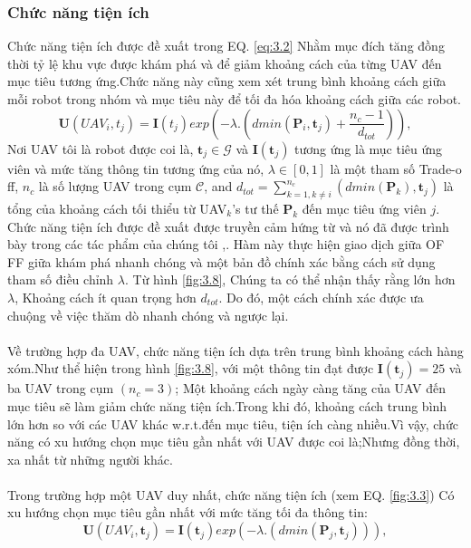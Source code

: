 \documentclass[11pt,openany]{book}
\begin{document}
\begin{algorimth}[H]
\subsubsection{Chức năng tiện ích}
Chức năng tiện ích được đề xuất trong EQ. \ref{eq:3.2} Nhằm mục đích tăng đồng thời tỷ lệ khu vực được khám phá và để giảm khoảng cách của từng UAV đến mục tiêu tương ứng.Chức năng này cũng xem xét trung bình khoảng cách giữa mỗi robot trong nhóm và mục tiêu này để tối đa hóa khoảng cách giữa các robot.
\begin{equation}
    \mathbf{U}(UAV_i,t_j)=\mathbf{I}(t_j)exp(-\lambda.(dmin(\mathbf{P}_i,\mathbf{t}_j)+\frac{n_c-1}{d_{tot}})),
\end{equation}
Nơi UAV tôi là robot được coi là, $\mathbf{t}_j \in \mathcal{G}$ và $\mathbf{I}(\mathbf{t}_j)$ tương ứng là mục tiêu ứng viên và mức tăng thông tin tương ứng của nó, $\lambda \in [0,1]$ là một tham số Trade-o ff, $n_c$ là số lượng UAV trong cụm $\mathcal{C}$, and $d_{tot} = \sum_{k=1, k\neq i}^{n_c}(dmin(\mathbf{P}_k),\mathbf{t}_j) $ là tổng của khoảng cách tối thiểu từ UAV$_k$'s tư thế $\mathbf{P}_k$ đến mục tiêu ứng viên $j$. Chức năng tiện ích được đề xuất được truyền cảm hứng từ \cite{heng2015efficient} và nó đã được trình bày trong các tác phẩm của chúng tôi \cite{mahdoui2017cooperative},\cite{mahdoui2018cooperative}. Hàm này thực hiện giao dịch giữa OF FF giữa khám phá nhanh chóng và một bản đồ chính xác bằng cách sử dụng tham số điều chỉnh $\lambda$. Từ hình \ref{fig:3.8}, Chúng ta có thể nhận thấy rằng lớn hơn $\lambda$, Khoảng cách ít quan trọng hơn $d_{tot}$. Do đó, một cách chính xác được ưa chuộng về việc thăm dò nhanh chóng và ngược lại.\\\\
Về trường hợp đa UAV, chức năng tiện ích dựa trên trung bình khoảng cách hàng xóm.Như thể hiện trong hình \ref{fig:3.8}, với một thông tin đạt được $\mathbf{I}(\mathbf{t}_j)=25$ và ba UAV trong cụm $(n_c=3)$; Một khoảng cách ngày càng tăng của UAV đến mục tiêu sẽ làm giảm chức năng tiện ích.Trong khi đó, khoảng cách trung bình lớn hơn so với các UAV khác w.r.t.đến mục tiêu, tiện ích càng nhiều.Vì vậy, chức năng có xu hướng chọn mục tiêu gần nhất với UAV được coi là;Nhưng đồng thời, xa nhất từ những người khác.\\\\
Trong trường hợp một UAV duy nhất, chức năng tiện ích (xem EQ. \ref{fig:3.3}) Có xu hướng chọn mục tiêu gần nhất với mức tăng tối đa thông tin:
\begin{equation}
    \mathbf{U}(UAV_i,\mathbf{t}_j)=\mathbf{I}(\mathbf{t}_j)exp(-\lambda.(dmin(\mathbf{P}_j,\mathbf{t}_j))),

\end{equation}
\end{algorimth}
\end{document}
